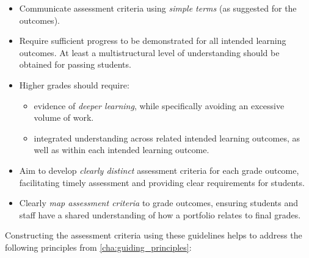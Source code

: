 \begin{itemize}[noitemsep,nolistsep]
  \item Communicate assessment criteria using \emph{simple terms} (as suggested for the outcomes).
  \item Require sufficient progress to be demonstrated for all intended learning outcomes. At least a multistructural level of understanding should be obtained for passing students.
  \item Higher grades should require:
  \begin{itemize}[noitemsep,nolistsep]
  	\item evidence of \emph{deeper learning}, while specifically avoiding an excessive volume of work.
  	\item integrated understanding across related intended learning outcomes, as well as within each intended learning outcome.
  \end{itemize}
  \item Aim to develop \emph{clearly distinct} assessment criteria for each grade outcome, facilitating timely assessment and providing clear requirements for students.  
  \item Clearly \emph{map assessment criteria} to grade outcomes, ensuring students and staff have a shared understanding of how a portfolio relates to final grades.
\end{itemize}

Constructing the assessment criteria using these guidelines helps to address the following principles from \cref{cha:guiding_principles}:

